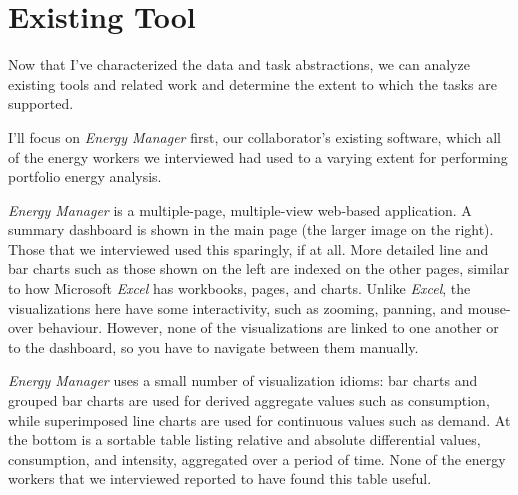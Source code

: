 \documentclass[journal]{vgtc}                %
\newcommand{\bstart}[1]{\vspace{1mm} \noindent{\textbf{#1:}}}
\begin{document}

\section{Existing Tool}
\label{existing-tool}


Now that I've characterized the data and task abstractions, we can analyze existing tools and related work and determine the extent to which the tasks are supported.

I'll focus on {\it Energy Manager} first, our collaborator's existing software, which all of the energy workers we interviewed had used to a varying extent for performing portfolio energy analysis.

{\it Energy Manager} is a multiple-page, multiple-view web-based application.
A summary dashboard is shown in the main page (the larger image on the right). 
Those that we interviewed used this sparingly, if at all. 
More detailed line and bar charts such as those shown on the left are indexed on the other pages, similar to how Microsoft {\it Excel} has workbooks, pages, and charts. 
Unlike {\it Excel}, the visualizations here have some interactivity, such as zooming, panning, and mouse-over behaviour. 
However, none of the visualizations are linked to one another or to the dashboard, so you have to navigate between them manually.

\bstart{Analysis} {\it Energy Manager} uses a small number of visualization idioms: bar charts and grouped bar charts are used for derived aggregate values such as consumption, while superimposed line charts are used for continuous values such as demand. 
At the bottom is a sortable table listing relative and absolute differential values, consumption, and intensity, aggregated over a period of time. 
None of the energy workers that we interviewed reported to have found this table useful.
\end{document}
